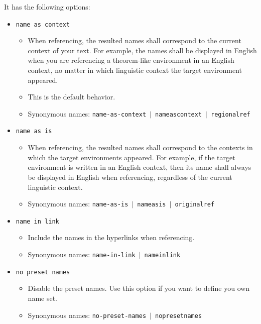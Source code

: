 \documentclass[classical]{einfart}
\newcommand{\packageoption}[1]{\texttt{\textcolor{code-option}{#1}}}
\begin{document}
\medskip
It has the following options:
\begin{itemize}[label=,leftmargin=1.25em,itemindent=-1.25em]
    \item \packageoption{name as context}
        \begin{itemize}
            \item When referencing, the resulted names shall correspond to the current context of your text. For example, the names shall be displayed in English when you are referencing a theorem-like environment in an English context, no matter in which linguistic context the target environment appeared.
            \item This is the default behavior.
            \item Synonymous names: \packageoption{name-as-context} \,$|$\, \packageoption{nameascontext} \,$|$\, \packageoption{regionalref}
        \end{itemize}
    \item \packageoption{name as is}
        \begin{itemize}
            \item When referencing, the resulted names shall correspond to the contexts in which the target environments appeared. For example, if the target environment is written in an English context, then its name shall always be displayed in English when referencing, regardless of the current linguistic context.
            \item Synonymous names: \packageoption{name-as-is} \,$|$\, \packageoption{nameasis} \,$|$\, \packageoption{originalref}
        \end{itemize}
    \item \packageoption{name in link}
        \begin{itemize}
            \item Include the names in the hyperlinks when referencing.
            \item Synonymous names: \packageoption{name-in-link} \,$|$\, \packageoption{nameinlink}
        \end{itemize}
    \item \packageoption{no preset names}
        \begin{itemize}
            \item Disable the preset names. Use this option if you want to define you own name set.
            \item Synonymous names: \packageoption{no-preset-names} \,$|$\, \packageoption{nopresetnames}
        \end{itemize}
\end{itemize}
\end{document}
